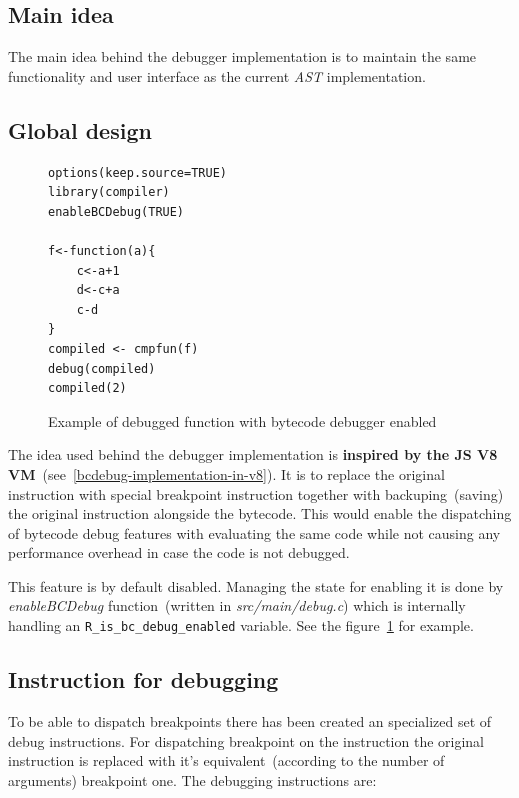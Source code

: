 \documentclass[thesis=M,english]{FITthesis}[2018/10/20]
\newcommand{\code}[1]{\texttt{#1}}
\begin{document}
\subsection{Main idea}

The main idea behind the debugger implementation is to maintain the same functionality and user interface as the current \textit{AST} implementation.

\subsection{Global design}

\begin{figure}[h]
\begin{lstlisting}
options(keep.source=TRUE)
library(compiler)
enableBCDebug(TRUE)

f<-function(a){
    c<-a+1
    d<-c+a
    c-d
}
compiled <- cmpfun(f)
debug(compiled)
compiled(2)
\end{lstlisting}
	\caption{Example of debugged function with bytecode debugger enabled}\label{fig:debugged-bcdebug-enabled}
\end{figure}

The idea used behind the debugger implementation is \textbf{inspired by the JS V8 VM}~(see~\ref{bcdebug-implementation-in-v8}). It is to replace the original instruction with special breakpoint instruction together with backuping~(saving) the original instruction alongside the bytecode. This would enable the dispatching of bytecode debug features with evaluating the same code while not causing any performance overhead in case the code is not debugged.

This feature is by default disabled. Managing the state for enabling it is done by \textit{enableBCDebug} function~(written in \textit{src/main/debug.c}) which is internally handling an \code{R{\_}is{\_}bc{\_}debug{\_}enabled} variable. See the figure~\ref{fig:debugged-bcdebug-enabled} for example.

\subsection{Instruction for debugging}\label{instruction-for-debugging}

To be able to dispatch breakpoints there has been created an specialized set of debug instructions. For dispatching breakpoint on the instruction the original instruction is replaced with it's equivalent~(according to the number of arguments) breakpoint one. The debugging instructions are:
\end{document}
